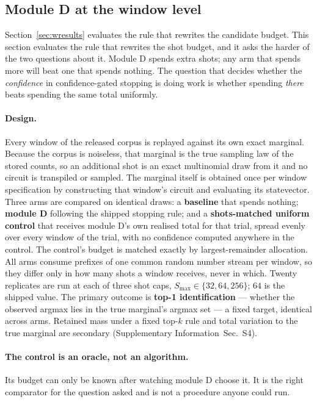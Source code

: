 \documentclass[final,5p,times,longtitle]{elsarticle}
\newcommand{\SI}{Supplementary Information}
\newcommand{\SIdresults}{\SI{}~Sec.~S4}
\newcommand{\Smax}{S_{\max}}
\begin{document}
\subsection{Module D at the window level}
\label{sec:dresults}

Section~\ref{sec:wresults} evaluates the rule that rewrites the candidate
budget. This section evaluates the rule that rewrites the shot budget, and
it asks the harder of the two questions about it. Module D spends extra
shots; any arm that spends more will beat one that spends nothing. The
question that decides whether the \emph{confidence} in confidence-gated
stopping is doing work is whether spending \emph{there} beats spending the
same total uniformly.

\paragraph{Design.} Every window of the released corpus is replayed against
its own exact marginal. Because the corpus is noiseless, that marginal is
the true sampling law of the stored counts, so an additional shot is an
exact multinomial draw from it and no circuit is transpiled or sampled. The
marginal itself is obtained once per window specification by constructing
that window's circuit and evaluating its statevector. Three arms are
compared on identical draws: a \textbf{baseline} that spends nothing;
\textbf{module D} following the shipped stopping rule; and a
\textbf{shots-matched uniform control} that receives module D's own
realised total for that trial, spread evenly over every window of the
trial, with no confidence computed anywhere in the control. The control's
budget is matched exactly by largest-remainder allocation. All arms consume
prefixes of one common random number stream per window, so they differ only
in how many shots a window receives, never in which. Twenty replicates are
run at each of three shot caps, $\Smax\in\{32,64,256\}$; $64$ is the
shipped value. The primary outcome is \textbf{top-1 identification} ---
whether the observed argmax lies in the true marginal's argmax set --- a
fixed target, identical across arms. Retained mass under a fixed top-$k$
rule and total variation to the true marginal are secondary
(\SIdresults{}).

\paragraph{The control is an oracle, not an algorithm.} Its budget can only
be known after watching module D choose it. It is the right comparator for
the question asked and is not a procedure anyone could run.
\end{document}

